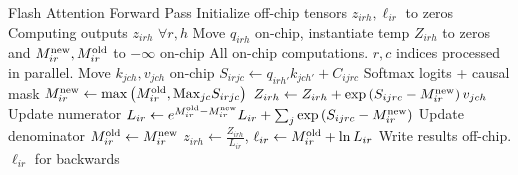 \begin{algo}{Flash Attention Forward Pass}
\State Initialize off-chip tensors $ z _{ irh },  \ell _{ ir }$ to zeros \Comment Computing outputs $ z _{ irh } $ $ \forall r, h $
\State Move  $ q _{ irh }$ on-chip, instantiate temp $Z _{ irh }$ to zeros and $ M ^{ {\rm new} } _{ ir }, M ^{ {\rm old} } _{ ir } $ to $ -\infty $ on-chip
 \Comment All on-chip computations. $ r, c $ indices processed in parallel.
    \State Move  $ k_{ jch },v _{ jch }$ on-chip
    \State $ S _{ irjc } \gets   q _{ irh' } k _{ jch' } + C _{ ijrc } $ \Comment Softmax logits + causal mask
    \State $ M ^{ {\rm new} } _{ ir } \gets  \max \left ( M ^{ {\rm  old} } _{ ir }, {\rm Max}_{ jc }  S _{ irjc }  \right )   $
    \State $ Z _{ irh } \gets   Z _{ irh } +\exp \left (  S _{ ijrc } - M ^{ {\rm  new} } _{ ir }  \right ) v _{ jch }$ \Comment Update numerator
    \State $ L _{ ir } \gets   e ^{ M ^{ {\rm old} } _{ ir } - M ^{ {\rm  new} } _{ ir } } L _{ ir } +\sum _{ j }\exp \left (   S _{ ijrc } - M ^{ {\rm  new} } _{ ir }   \right ) $ \Comment Update denominator
    \State $ M ^{ {\rm old} } _{ ir } \gets  M ^{ {\rm  new} } _{ ir }   $
\EndFor
\State $ z _{ irh } \gets \frac{Z _{ irh }}{L _{ ir }}$, $  \ell _{ ir } \gets M ^{ {\rm old} } _{ ir } + \ln L _{ ir }$ \Comment Write results off-chip. $ \ell _{ ir } $ for backwards
\EndFor
\label{algo_fa_fwd_advanced}
\end{algo}


